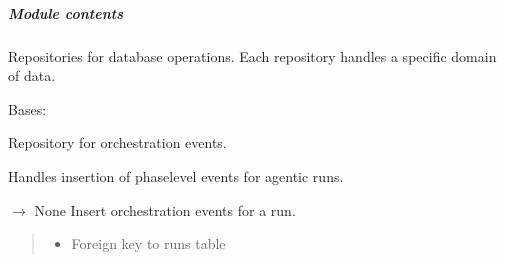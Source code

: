\documentclass[letterpaper,10pt,english]{sphinxmanual}
\begin{document}
\subparagraph{Module contents}
\label{\detokenize{core.database.repositories:module-core.database.repositories}}\label{\detokenize{core.database.repositories:module-contents}}
\sphinxAtStartPar
Repositories for database operations.
Each repository handles a specific domain of data.

\begin{fulllineitems}
\label{\detokenize{core.database.repositories:core.database.repositories.EventsRepository}}
\pysigstartsignatures
\pysiglinewithargsret
{}
{}
{}
\pysigstopsignatures
\sphinxAtStartPar
Bases: 

\sphinxAtStartPar
Repository for orchestration events.

\sphinxAtStartPar
Handles insertion of phase\sphinxhyphen{}level events for agentic runs.

\begin{fulllineitems}
\label{\detokenize{core.database.repositories:core.database.repositories.EventsRepository.insert_events}}
\pysigstartsignatures
\pysiglinewithargsret
{}
{\sphinxparamcomma {}}
{{ $\rightarrow$ None}}
\pysigstopsignatures
\sphinxAtStartPar
Insert orchestration events for a run.
\begin{quote}\begin{description}
\begin{itemize}
\item {} 
\sphinxAtStartPar
{} \textendash{} Foreign key to runs table


\end{itemize}
\end{description}
\end{quote}
\end{fulllineitems}
\end{fulllineitems}
\end{document}
